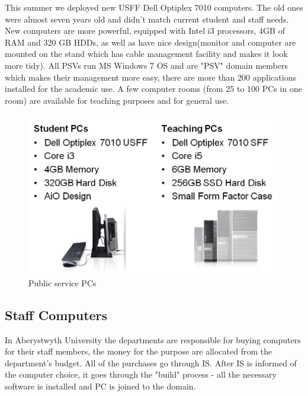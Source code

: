 \documentclass[10pt,a4paper,headinclude=true,twoside]{report}
\begin{document}
This summer we deployed new USFF Dell Optiplex 7010 \cite{PSVs} computers. The old ones were almost seven years old and didn't match current student and staff needs. New computers are more powerful, equipped with Intel i3 processors, 4GB of RAM and 320 GB HDDs, as well as have nice design(monitor and computer are mounted on the stand which has cable management facility and makes it look more tidy). All PSVs run MS Windows 7 OS and are "PSV" domain members which makes their management more easy, there are more than 200 applications installed for the academic use. A few computer rooms (from 25 to 100 PCs in one room) are available for teaching purposes and for general use.
\begin{figure}[H]
\centering
\centerline{\includegraphics[scale=0.5]{./PSVs}}
\caption{Public service PCs \cite{PSVs}}
\label{fig:PSVs}
\end{figure}
\subsection{Staff Computers}
In Aberystwyth University the departments are responsible for buying computers for their staff members, the money for the purpose are allocated from the department's budget. All of the purchases go through IS. After IS is informed of the computer choice, it goes through the "build" process - all the necessary software is installed and PC is joined to the domain. 
\end{document}
